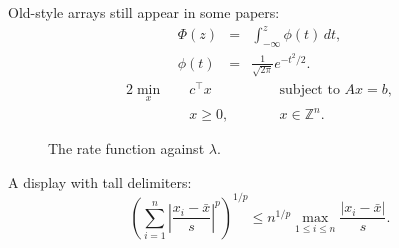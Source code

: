 \proseE
Old-style arrays still appear in some papers:
\begin{eqnarray}
\Phi(z) & = & \int_{-\infty}^{z} \phi(t)\, dt, \\
\phi(t) & = & \frac{1}{\sqrt{2\pi}} e^{-t^2/2}.
\end{eqnarray}
\proseD
\begin{alignat}{2}
\min_{x}\quad & c^\top x & \qquad & \text{subject to } Ax = b, \label{eq:lp1}\\
& x \ge 0, && x \in \mathbb{Z}^n. \label{eq:lp2}
\end{alignat}
\proseE

\begin{figure}[t]
\centering
{}
\caption{The rate function against $\lambda$.}
\end{figure}

\proseD
A display with tall delimiters:
\begin{equation}\label{eq:tall}
\left( \sum_{i=1}^n \left| \frac{x_i - \bar{x}}{s} \right|^p \right)^{1/p} \le n^{1/p} \max_{1 \le i \le n} \frac{|x_i - \bar{x}|}{s}.
\end{equation}
\proseE
